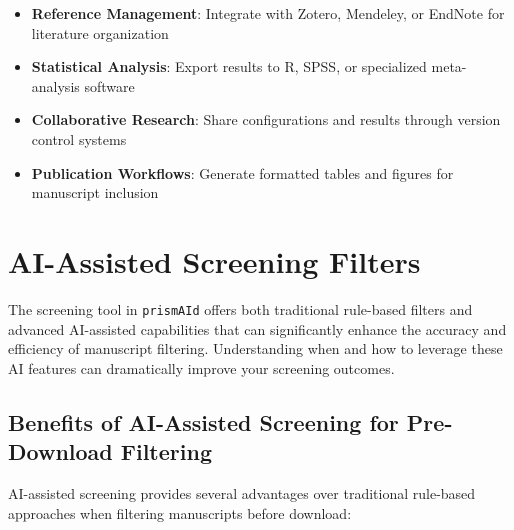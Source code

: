 \begin{itemize}
    \item \textbf{Reference Management}: Integrate with Zotero, Mendeley, or EndNote for literature organization
    \item \textbf{Statistical Analysis}: Export results to R, SPSS, or specialized meta-analysis software
    \item \textbf{Collaborative Research}: Share configurations and results through version control systems
    \item \textbf{Publication Workflows}: Generate formatted tables and figures for manuscript inclusion
\end{itemize}

\section{AI-Assisted Screening Filters}

The screening tool in \texttt{prismAId} offers both traditional rule-based filters and advanced AI-assisted capabilities that can significantly enhance the accuracy and efficiency of manuscript filtering. Understanding when and how to leverage these AI features can dramatically improve your screening outcomes.



\subsection{Benefits of AI-Assisted Screening for Pre-Download Filtering}

AI-assisted screening provides several advantages over traditional rule-based approaches when filtering manuscripts before download:

